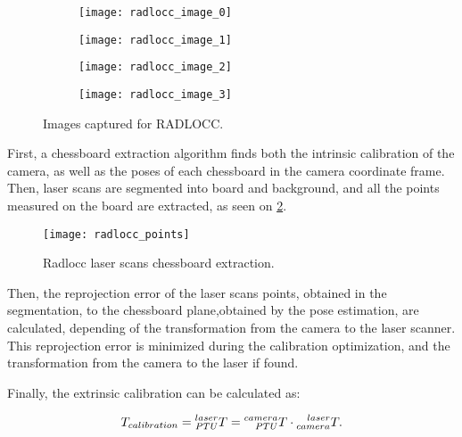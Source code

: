 \begin{figure}
    
    \centering
    \begin{subfigure}{0.5\textwidth}
        \centering
        \texttt{[image: radlocc\_image\_0]}
    \end{subfigure}%
    \begin{subfigure}{0.5\textwidth}
        \centering
        \texttt{[image: radlocc\_image\_1]}
    \end{subfigure}%

    \vspace{1cm}
    
    \begin{subfigure}{0.5\textwidth}
        \centering
        \texttt{[image: radlocc\_image\_2]}
    \end{subfigure}%
    \begin{subfigure}{0.5\textwidth}
        \centering
        \texttt{[image: radlocc\_image\_3]}
    \end{subfigure}%

    \caption{Images captured for RADLOCC.}
    \label{figure:radlocc-images}
\end{figure}

First, a chessboard extraction algorithm finds both the intrinsic calibration of the camera, as well as the poses of each chessboard in the camera coordinate frame. Then, laser scans are segmented into board and background, and all the points measured on the board are extracted, as seen on \cref{figure:radlocc-points}.

\begin{figure}
    \centering
    \texttt{[image: radlocc\_points]}
    \caption{Radlocc laser scans chessboard extraction.}
    \label{figure:radlocc-points}
\end{figure}

Then, the reprojection error of the laser scans points, obtained in the segmentation, to the chessboard plane,obtained by the pose estimation, are calculated, depending of the transformation from the camera to the laser scanner. This reprojection error is minimized during the calibration optimization, and the transformation from the camera to the laser if found.

Finally, the extrinsic calibration can be calculated as:

\begin{equation}
    \label{eqn:radlocc-full-calibration}
    T_{calibration} = \TF{PTU}{laser} = \TF{PTU}{camera} \cdot \TF{camera}{laser}.
\end{equation}

